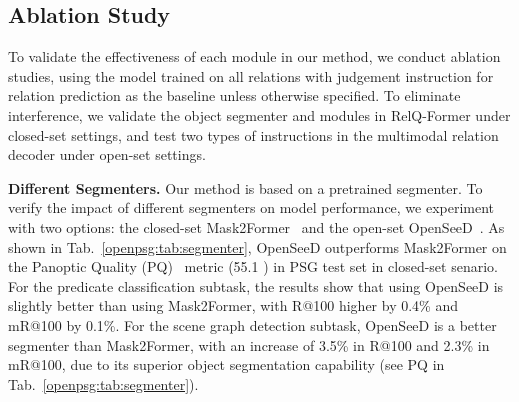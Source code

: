 \begin{table}[t]\small
    \centering
    \caption{Comparison between our OpenPSG and other methods on the VG dataset in both closed-set and open-set scenarios with predicate classification subtask.}
    \label{openpsg:tab:vg_results}
\end{table}

\subsection{Ablation Study}
To validate the effectiveness of each module in our method, we conduct ablation studies, using the model trained on all relations with judgement instruction for relation prediction as the baseline unless otherwise specified.
To eliminate interference, we validate the object segmenter and modules in RelQ-Former under closed-set settings, and test two types of instructions in the multimodal relation decoder under open-set settings.

\noindent \textbf{Different Segmenters.}
Our method is based on a pretrained segmenter.
To verify the impact of different segmenters on model performance, we experiment with two options:
the closed-set Mask2Former~\citep{cheng2022masked} and the open-set OpenSeeD~\citep{zhang2023simple}. 
As shown in Tab.~\ref{openpsg:tab:segmenter}, OpenSeeD outperforms Mask2Former on the Panoptic Quality (PQ)~\citep{kirillov2019panoptic} metric (55.1 ) in PSG test set in closed-set senario.
For the predicate classification subtask, the results show that using OpenSeeD is slightly better than using Mask2Former, with R@100 higher by 0.4\% and mR@100 by 0.1\%.
For the scene graph detection subtask, OpenSeeD is a better segmenter than Mask2Former, with an increase of 3.5\% in R@100 and 2.3\% in mR@100, due to its superior object segmentation capability (see PQ in Tab.~\ref{openpsg:tab:segmenter}).


